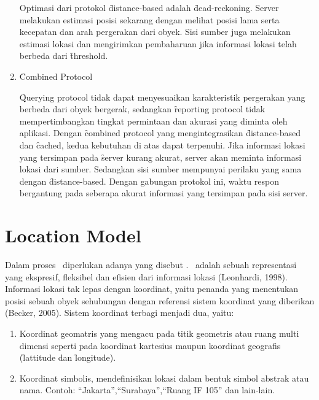 \begin{enumerate}[noitemsep,nolistsep,leftmargin=0cm,itemindent=.5cm,listparindent=\parindent]
        Optimasi dari protokol \f{distance-based} adalah \f{dead-reckoning}. Server
        melakukan estimasi posisi sekarang dengan melihat posisi lama serta kecepatan
        dan arah pergerakan dari obyek. Sisi sumber juga melakukan estimasi lokasi
        dan mengirimkan pembaharuan jika informasi lokasi telah berbeda dari \f{threshold}.

    \item \f{Combined Protocol}

        \f{Querying protocol} tidak dapat menyesuaikan karakteristik pergerakan yang 
        berbeda dari obyek bergerak, sedangkan \f{reporting protocol} tidak mempertimbangkan
        tingkat permintaan dan akurasi yang diminta oleh aplikasi. Dengan \f{combined
        protocol} yang mengintegrasikan \f{distance-based} dan \f{cached}, kedua
        kebutuhan di atas dapat terpenuhi. Jika informasi lokasi yang tersimpan
        pada \f{server} kurang akurat, server akan meminta informasi lokasi dari sumber.
        Sedangkan sisi sumber mempunyai perilaku yang sama dengan \f{distance-based}.
        Dengan gabungan protokol ini, waktu respon bergantung pada seberapa akurat
        informasi yang tersimpan pada sisi server.
\end{enumerate}

\section{Location Model}
\label{sec:Location Model}

Dalam proses \tracking~diperlukan adanya yang disebut \locationmodel.
\LocationModel~adalah sebuah representasi yang ekspresif, fleksibel dan efisien
dari informasi lokasi (Leonhardi, 1998). Informasi lokasi tak lepas dengan
koordinat, yaitu penanda yang menentukan posisi sebuah obyek sehubungan dengan
referensi sistem koordinat yang diberikan (Becker, 2005). Sistem koordinat
terbagi menjadi dua, yaitu:

\begin{enumerate}
    \item Koordinat geomatris yang mengacu pada titik geometris atau ruang multi dimensi
        seperti pada koordinat kartesius maupun koordinat geografis (\f{lattitude} dan
        \f{longitude}).
    \item Koordinat simbolis, mendefinisikan lokasi dalam bentuk simbol abstrak atau
        nama. Contoh: ``Jakarta'',``Surabaya'',``Ruang IF 105'' dan lain-lain.
\end{enumerate}

